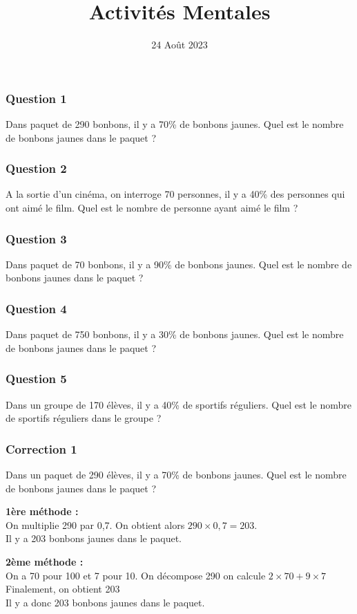 \documentclass[15pt, mathserif]{beamer}
\title{Activités Mentales}
\date{24 Août 2023}
\begin{document}
\begin{frame}
    \titlepage
\end{frame}

\begin{frame} 
	\frametitle{Question 1}
Dans paquet de 290 bonbons, il y a 70\% de bonbons jaunes. Quel est le nombre de bonbons jaunes dans le paquet ?\end{frame}


\begin{frame} 
	\frametitle{Question 2}
A la sortie d'un cinéma, on interroge 70 personnes, il y a 40\% des personnes qui ont aimé le film. Quel est le nombre de personne ayant aimé le film ?\end{frame}


\begin{frame} 
	\frametitle{Question 3}
Dans paquet de 70 bonbons, il y a 90\% de bonbons jaunes. Quel est le nombre de bonbons jaunes dans le paquet ?\end{frame}


\begin{frame} 
	\frametitle{Question 4}
Dans paquet de 750 bonbons, il y a 30\% de bonbons jaunes. Quel est le nombre de bonbons jaunes dans le paquet ?\end{frame}


\begin{frame} 
	\frametitle{Question 5}
Dans un groupe de 170 élèves, il y a 40\% de sportifs réguliers. Quel est le nombre de sportifs réguliers dans le groupe ?\end{frame}


\begin{frame}
\vspace{-10mm}
	\frametitle{Correction 1}
Dans un paquet de 290 élèves, il y a 70\% de bonbons jaunes. Quel est le nombre de bonbons jaunes dans le paquet ? \begin{multicols}{2} \textbf{1ère méthode : \\} On multiplie 290 par 0,7. On obtient alors $290 \times 0,7=203$. \\ Il y a 203 bonbons jaunes dans le paquet. 
 \columnbreak 
 
 \textbf{2ème méthode :} \\ On a 70 pour 100 et 7 pour 10. On décompose 290 on calcule $2\times70+9\times7$ \\ Finalement, on obtient 203\\ Il y a donc 203 bonbons jaunes dans le paquet. \end{multicols}\end{frame}
\end{document}
